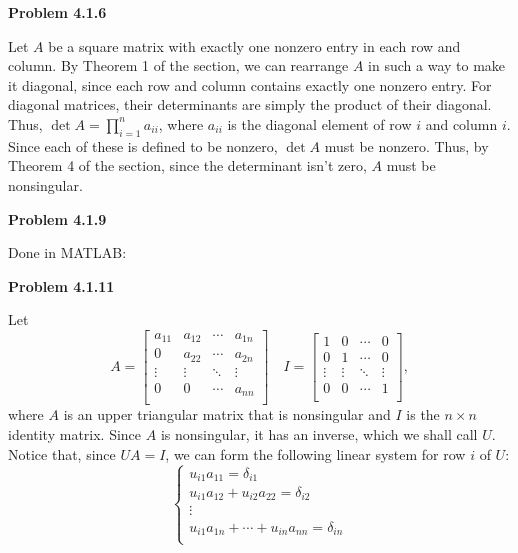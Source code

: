 \documentclass{article}
\newcommand{\Problem}[1]{\textbf{Problem #1}}
\begin{document}
\Problem{4.1.6}

Let $A$ be a square matrix with exactly one nonzero entry in each row and column. By Theorem 1 of the section, we can rearrange $A$ in such a way to make it diagonal, since each row and column contains exactly one nonzero entry. For diagonal matrices, their determinants are simply the product of their diagonal. Thus, $\det{A} = \displaystyle\prod_{i=1}^n a_{ii}$, where $a_{ii}$ is the diagonal element of row $i$ and column $i$. Since each of these is defined to be nonzero, $\det{A}$ must be nonzero. Thus, by Theorem 4 of the section, since the determinant isn't zero, $A$ must be nonsingular. 

\Problem{4.1.9}

Done in MATLAB:

\Problem{4.1.11}

Let \begin{equation*}
A = 
\begin{bmatrix}
a_{11} & a_{12} & \cdots & a_{1n}\\
0 & a_{22} &\cdots & a_{2n}\\
\vdots & \vdots & \ddots & \vdots\\
0 & 0 & \cdots & a_{nn}\\
\end{bmatrix}
\quad
I = 
\begin{bmatrix}
1 & 0 & \cdots & 0\\
0 & 1 &\cdots & 0\\
\vdots & \vdots & \ddots & \vdots\\
0 & 0 & \cdots & 1\\
\end{bmatrix},
\end{equation*}
where $A$ is an upper triangular matrix that is nonsingular and $I$ is the $n\times n$ identity matrix. Since $A$ is nonsingular, it has an inverse, which we shall call $U$. Notice that, since $UA = I$, we can form the following linear system for row $i$ of $U$:
\begin{equation*}
\begin{cases}
	u_{i1}a_{11} = \delta_{i1}\\
	u_{i1}a_{12} + u_{i2}a_{22} = \delta_{i2}\\
	\vdots\\
	u_{i1}a_{1n} + \cdots +u_{in}a_{nn} = \delta_{in}\\
\end{cases}	
\end{equation*}
\end{document}
